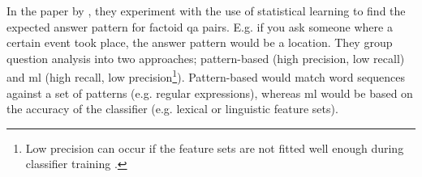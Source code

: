 In the paper by \cite{TobaAdrianiManurung2011}, they experiment with the use of statistical 
learning to find the expected answer pattern for factoid \gls{qa} pairs. E.g. if you ask 
someone where a certain event took place, the answer pattern would be a location. They group question analysis into two approaches; pattern-based (high precision, low recall) and \gls{ml} 
(high recall, low precision\footnote{Low precision can occur if the feature sets are not fitted 
	well enough during 
	classifier training \cite[p.~283]{TobaAdrianiManurung2011}.}). Pattern-based would match 
word sequences against a set of patterns (e.g. regular expressions), whereas \gls{ml} would be 
based on the accuracy of the classifier (e.g. lexical or linguistic feature sets). 
\begin{comment}
The retrieval of \gls{qa} pairs is done by using a statistical relation framework: Bayesian 
Analogical Reasoning (BAR). Features sets are then extracted from the training set by use of binary 
values checking if the question contains a given question word. The BAR framework then learns the 
related features and computes the estimation for them. Thereafter \gls{qa} pairs are retrieved from 
the testing set and compared against the training set. Afterwards, the \gls{qa} pairs that have 
identical question words are identified, and overlapping pairs are grouped according their named 
entity group.

To retrieve named entities, they used two different recognizers. The first was Stanford (extracts the
person, organization and location), and the second was dictionary based (extract number
entities and fine-grained noun-based entities). 

Question words were extracted by building a question word list from the training set (achieved 
by using Stanford Part-of-Speech (POS) tagger). Then for each question, look for the appearance 
of the question word to create the feature set.

Mapped named-entities; e.g. ORGANIZATION became NEorganization.

\end{comment}

